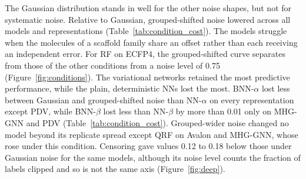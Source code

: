 The Gaussian distribution stands in well for the other noise shapes, but not for systematic noise. Relative to Gaussian, grouped-shifted noise lowered \aucnorm{} across all models and representations (Table~\ref{tab:condition_cost}). The models struggle when the molecules of a scaffold family share an offset rather than each receiving an independent error. For RF on ECFP4, the grouped-shifted curve separates from those of the other conditions from a noise level of 0.75 (Figure~\ref{fig:conditions}). The variational networks retained the most predictive performance, while the plain, deterministic NNs lost the most. BNN-$\alpha$ lost less \aucnorm{} between Gaussian and grouped-shifted noise than NN-$\alpha$ on every representation except PDV, while BNN-$\beta$ lost less than NN-$\beta$ by more than 0.01 only on MHG-GNN and PDV (Table~\ref{tab:condition_cost}). Grouped-wider noise changed no model beyond its replicate spread except QRF on Avalon and MHG-GNN, whose \aucnorm{} rose under this condition. Censoring gave \aucnorm{} values 0.12 to 0.18 below those under Gaussian noise for the same models, although its noise level counts the fraction of labels clipped and so is not the same axis (Figure~\ref{fig:deep}).

